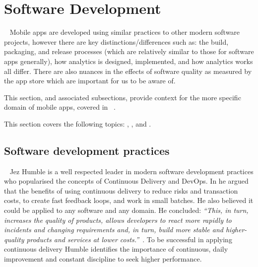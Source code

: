 

\section{Software Development}~\label{rw-software-development-section}
Mobile apps are developed using similar practices to other modern software projects, however there are key distinctions/differences such as: the build, packaging, and release processes (which are relatively similar to those for software apps generally), how analytics is designed, implemented, and how analytics works all differ. There are also nuances in the effects of software quality as measured by the app store which are important for us to be aware of.

This section, and associated subsections, provide context for the more specific domain of mobile apps, covered in ~.
 
This section covers the following topics: , , and .

\subsection{Software development practices}~\label{rw-software-development-practices-topic}
Jez Humble is a well respected leader in modern software development practices who popularised the concepts of Continuous Delivery and DevOps. In  he argued that the benefits of using continuous delivery to reduce risks and transaction costs, to create fast feedback loops, and work in small batches. He also believed it could be applied to any software and any domain. He concluded: \emph{``This, in turn, increases the quality of products, allows developers to react more rapidly to incidents and changing requirements and, in turn, build more stable and higher-quality products and services at lower costs.''}~. To be successful in applying continuous delivery Humble identifies the importance of continuous, daily improvement and constant discipline to seek higher performance. 

